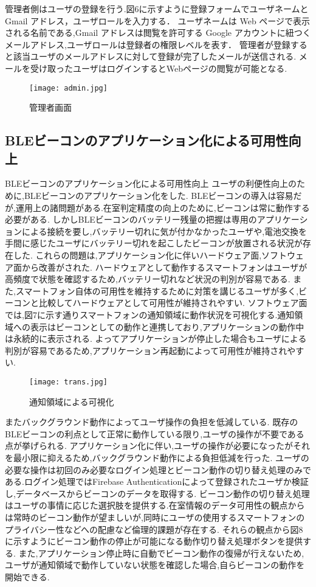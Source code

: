 \documentclass[a4j,8pt,twocolumn]{extarticle}
\begin{document}
管理者側はユーザの登録を行う.図6に示すように登録フォームでユーザネームと Gmail アドレス，ユーザロールを入力する．
ユーザネームは Web ページで表示される名前である,Gmail アドレスは閲覧を許可する Google アカウントに紐つくメールアドレス,ユーザロールは登録者の権限レベルを表す．
管理者が登録すると該当ユーザのメールアドレスに対して登録が完了したメールが送信される.
メールを受け取ったユーザはログインするとWebページの閲覧が可能となる.
\begin{figure}[tbh]
    \centering
    \texttt{[image: admin.jpg]}
    \caption{管理者画面}
    \label{multipleBPM}
\end{figure}


\subsection{BLEビーコンのアプリケーション化による可用性向上}
BLEビーコンのアプリケーション化による可用性向上
ユーザの利便性向上のために,BLEビーコンのアプリケーション化をした.
BLEビーコンの導入は容易だが,運用上の諸問題がある.在室判定精度の向上のために,ビーコンは常に動作する必要がある.
しかしBLEビーコンのバッテリー残量の把握は専用のアプリケーションによる接続を要し,バッテリー切れに気が付かなかったユーザや,電池交換を手間に感じたユーザにバッテリー切れを起こしたビーコンが放置される状況が存在した.
これらの問題は,アプリケーション化に伴いハードウェア面,ソフトウェア面から改善がされた.
ハードウェアとして動作するスマートフォンはユーザが高頻度で状態を確認するため,バッテリー切れなど状況の判別が容易である.
また,スマートフォン自体の可用性を維持するために対策を講じるユーザが多く,ビーコンと比較してハードウェアとして可用性が維持されやすい.
ソフトウェア面では,図7に示す通りスマートフォンの通知領域に動作状況を可視化する.通知領域への表示はビーコンとしての動作と連携しており,アプリケーションの動作中は永続的に表示される.
よってアプリケーションが停止した場合もユーザによる判別が容易であるため,アプリケーション再起動によって可用性が維持されやすい.

\begin{figure}[tbh]
    \centering
    \texttt{[image: trans.jpg]}
    \caption{通知領域による可視化}
    \label{multipleBPM}
\end{figure}



またバックグラウンド動作によってユーザ操作の負担を低減している.
既存のBLEビーコンの利点として正常に動作している限り,ユーザの操作が不要である点が挙げられる.
アプリケーション化に伴い,ユーザの操作が必要になったがそれを最小限に抑えるため,バックグラウンド動作による負担低減を行った.
ユーザの必要な操作は初回のみ必要なログイン処理とビーコン動作の切り替え処理のみである.ログイン処理ではFirebase Authenticationによって登録されたユーザか検証し,データベースからビーコンのデータを取得する.
ビーコン動作の切り替え処理はユーザの事情に応じた選択肢を提供する.在室情報のデータ可用性の観点からは常時のビーコン動作が望ましいが,同時にユーザの使用するスマートフォンのプライバシー性などへの配慮など倫理的課題が存在する.
それらの観点から図8に示すようにビーコン動作の停止が可能になる動作切り替え処理ボタンを提供する.
また,アプリケーション停止時に自動でビーコン動作の復帰が行えないため,ユーザが通知領域で動作していない状態を確認した場合,自らビーコンの動作を開始できる.
\end{document}
